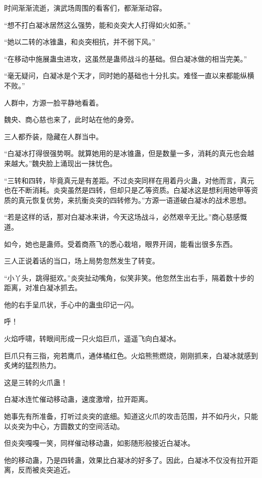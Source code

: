 
\begin{this_body}

时间渐渐流逝，演武场周围的看客们，都渐渐动容。

“想不打白凝冰居然这么强势，能和炎突大人打得如火如荼。”

“她以二转的冰锥蛊，和炎突相抗，并不弱下风。”

“在移动中施展蛊虫进攻，这虽然是蛊师战斗的基础。但白凝冰做的相当完美。”

“毫无疑问，白凝冰是个天才，同时她的基础也十分扎实。难怪一直以来都能纵横不败。”

人群中，方源一脸平静地看着。

魏央、商心慈也来了，此时站在他的身旁。

三人都乔装，隐藏在人群当中。

“白凝冰打得很强势啊。就算她用的是冰锥蛊，但是数量一多，消耗的真元也会越来越大。”魏央脸上涌现出一抹忧色。

“三转和四转，毕竟真元是有差距。不过炎突同样在用着丹火蛊，对他而言，真元也在不断消耗。炎突虽然是四转，但却只是乙等资质。白凝冰这是想利用她甲等资质的真元恢复优势，来抗衡炎突的四转修为。”方源一语道破白凝冰的战术思想。

“若是这样的话，那对白凝冰来讲，今天这场战斗，必然艰辛无比。”商心慈感慨道。

如今，她也是蛊师。受着商燕飞的悉心栽培，眼界开阔，能看出很多东西。

三人正说着话的当口，场上局势忽然发生了转变。

“小丫头，跳得挺欢。”炎突扯动嘴角，似笑非笑。他忽然生出右手，隔着数十步的距离，对准白凝冰抓去。

他的右手呈爪状，手心中的蛊虫印记一闪。

呼！

火焰呼啸，转眼间形成一只火焰巨爪，遥遥飞向白凝冰。

巨爪只有三指，宛若鹰爪，通体橘红色。火焰熊熊燃烧，刚刚抓来，白凝冰就感到炙烤的猛烈热力。

这是三转的火爪蛊！

白凝冰连忙催动移动蛊，速度激增，拉开距离。

她事先有所准备，打听过炎突的底细。知道这火爪的攻击范围，并不如丹火，只能以炎突为中心，方圆数丈的空间活动。

但炎突嘎嘎一笑，同样催动移动蛊，如影随形般接近白凝冰。

他的移动蛊，乃是四转蛊，效果比白凝冰的好多了。因此，白凝冰不仅没有拉开距离，反而被炎突追近。


\end{this_body}
